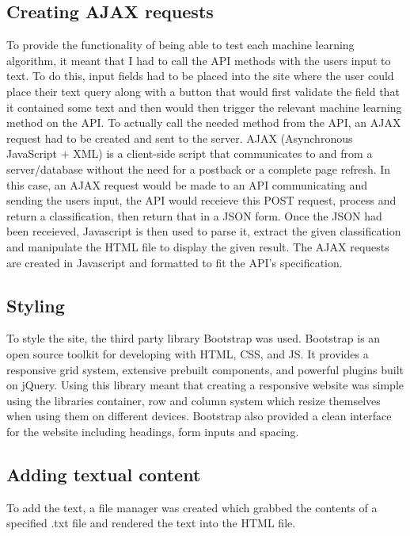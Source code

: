 \documentclass[a4paper,11pt]{report}
\begin{document}
\subsection{Creating AJAX requests}
To provide the functionality of being able to test each machine learning algorithm, it meant that I had to call the API methods with the users input to text. To do this, input fields had to be placed into the site where the user could place their text query along with a button that would first validate the field that it contained some text and then would then trigger the relevant machine learning method on the API. To actually call the needed method from the API, an AJAX request had to be created and sent to the server. AJAX (Asynchronous JavaScript + XML) is a client-side script that communicates to and from a server/database without the need for a postback or a complete page refresh. In this case, an AJAX request would be made to an API communicating and sending the users input, the API would receieve this POST request, process and return a classification, then return that in a JSON form. Once the JSON had been receieved, Javascript is then used to parse it, extract the given classification and manipulate the HTML file to display the given result. The AJAX requests are created in Javascript and formatted to fit the API's specification.

\subsection{Styling}
To style the site, the third party library Bootstrap was used. Bootstrap is an open source toolkit for developing with HTML, CSS, and JS. It provides a responsive grid system, extensive prebuilt components, and powerful plugins built on jQuery. Using this library meant that creating a responsive website was simple using the libraries container, row and column system which resize themselves when using them on different devices. Bootstrap also provided a clean interface for the website including headings, form inputs and spacing.

\subsection{Adding textual content}
To add the text, a file manager was created which grabbed the contents of a specified .txt file and rendered the text into the HTML file.



\end{document}
